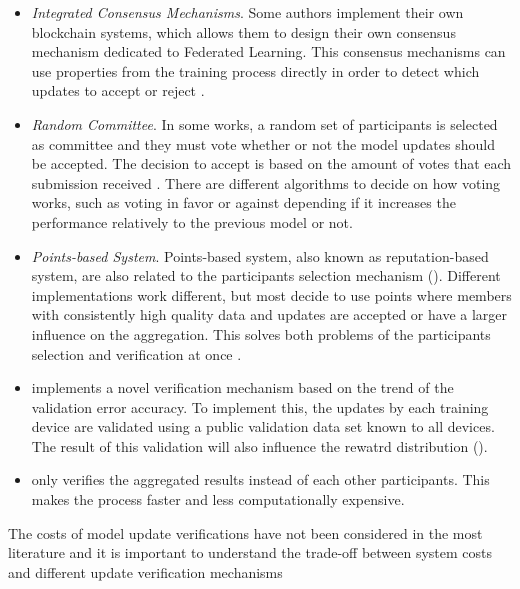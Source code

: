 \begin{itemize}
    \item \textit{Integrated Consensus Mechanisms}. Some authors implement their own blockchain systems, which allows them to design their own consensus mechanism dedicated to Federated Learning. This consensus mechanisms can use properties from the training process directly in order to detect which updates to accept or reject \cite{9293091, 10.1007/978-981-15-9213-3_12}.
    
    \item \textit{Random Committee}. In some works, a random set of participants is selected as committee and they must vote whether or not the model updates should be accepted. The decision to accept is based on the amount of votes that each submission received \cite{9159643}. There are different algorithms to decide on how voting works, such as voting in favor or against depending if it increases the performance relatively to the previous model or not.
    
    \item \textit{Points-based System}. Points-based system, also known as reputation-based system, are also related to the participants selection mechanism (). Different implementations work different, but most decide to use points where members with consistently high quality data and updates are accepted or have a larger influence on the aggregation. This solves both problems of the participants selection and verification at once \cite{10.48550/arxiv.2011.07516, 9170559, Peyvandi2022, 9292450}.
    
    \item \cite{8945913} implements a novel verification mechanism based on the trend of the validation error accuracy. To implement this, the updates by each training device are validated using a public validation data set known to all devices. The result of this validation will also influence the rewatrd distribution ().
    
    \item \cite{10.48550/arxiv.2009.09338} only verifies the aggregated results instead of each other participants. This makes the process faster and less computationally expensive.
    
\end{itemize}

The costs of model update verifications have not been considered in the most literature and it is important to understand the trade-off between system costs and different update verification mechanisms \cite{9403374}

